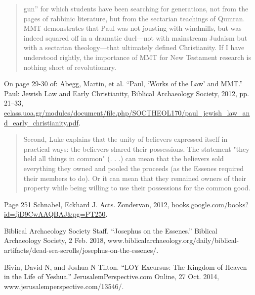 \documentclass[11pt]{article}
\begin{document}
\begin{thebibliography}{37}
\begin{quote}
gun” for which students have been searching for generations, not from the pages
of rabbinic literature, but from the sectarian teachings of Qumran. MMT
demonstrates that Paul was not jousting with windmills, but was indeed squared
off in a dramatic duel—not with mainstream Judaism but with a sectarian
theology—that ultimately defined Christianity. If I have understood rightly, the
importance of MMT for New Testament research is nothing short of revolutionary.
\end{quote}
On page 29-30 of:
Abegg, Martin, et al. “Paul, ‘Works of the Law’ and MMT.” Paul: Jewish Law and Early Christianity, Biblical Archaeology Society, 2012, pp. 21–33, \url{eclass.uoa.gr/modules/document/file.php/SOCTHEOL170/paul_jewish_law_and_early_christianity.pdf}.

\begin{quote}
Second, Luke explains that the unity of believers expressed itself in practical ways: the believers shared their possessions. The statement "they held all things in common" (. . .) can mean that the believers sold everything they owned and pooled the proceeds (as the Essenes required their members to do). Or it can mean that they remained owners of their property while being willing to use their possessions for the common good.
\end{quote}
Page 251
Schnabel, Eckhard J. Acts. Zondervan, 2012, \url{books.google.com/books?id=fjD9CwAAQBAJ&pg=PT250}.

Biblical Archaeology Society Staff. “Josephus on the Essenes.” Biblical Archaeology Society, 2 Feb. 2018, www.biblicalarchaeology.org/daily/biblical-artifacts/dead-sea-scrolls/josephus-on-the-essenes/.


Bivin, David N, and Joshua N Tilton. “LOY Excursus: The Kingdom of Heaven in the Life of Yeshua.” JerusalemPerspective.com Online, 27 Oct. 2014, www.jerusalemperspective.com/13546/.


\end{thebibliography}
\end{document}
